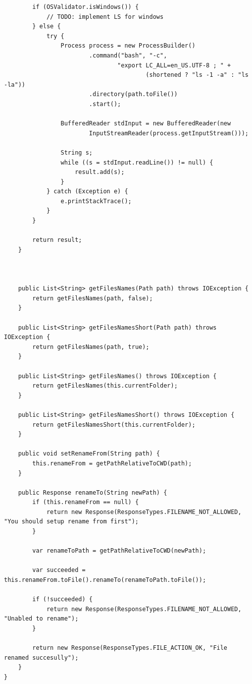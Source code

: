 \documentclass[a4paper,14pt]{extarticle}
\begin{document}
\begin{verbatim}
        if (OSValidator.isWindows()) {
            // TODO: implement LS for windows
        } else {
            try {
                Process process = new ProcessBuilder()
                        .command("bash", "-c",
                                "export LC_ALL=en_US.UTF-8 ; " +
                                        (shortened ? "ls -1 -a" : "ls -la"))
                        .directory(path.toFile())
                        .start();

                BufferedReader stdInput = new BufferedReader(new
                        InputStreamReader(process.getInputStream()));

                String s;
                while ((s = stdInput.readLine()) != null) {
                    result.add(s);
                }
            } catch (Exception e) {
                e.printStackTrace();
            }
        }

        return result;
    }



    public List<String> getFilesNames(Path path) throws IOException {
        return getFilesNames(path, false);
    }

    public List<String> getFilesNamesShort(Path path) throws IOException {
        return getFilesNames(path, true);
    }

    public List<String> getFilesNames() throws IOException {
        return getFilesNames(this.currentFolder);
    }

    public List<String> getFilesNamesShort() throws IOException {
        return getFilesNamesShort(this.currentFolder);
    }

    public void setRenameFrom(String path) {
        this.renameFrom = getPathRelativeToCWD(path);
    }

    public Response renameTo(String newPath) {
        if (this.renameFrom == null) {
            return new Response(ResponseTypes.FILENAME_NOT_ALLOWED, "You should setup rename from first");
        }

        var renameToPath = getPathRelativeToCWD(newPath);

        var succeeded = this.renameFrom.toFile().renameTo(renameToPath.toFile());

        if (!succeeded) {
            return new Response(ResponseTypes.FILENAME_NOT_ALLOWED, "Unabled to rename");
        }

        return new Response(ResponseTypes.FILE_ACTION_OK, "File renamed succesully");
    }
}
\end{verbatim}
\end{document}
